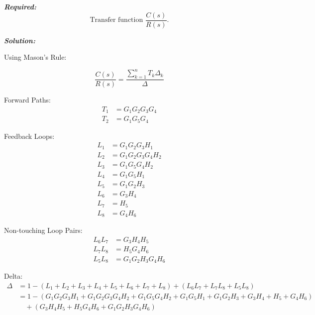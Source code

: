 ﻿\documentclass[11pt]{article}
\begin{document}
\noindent\textbf{\textit{Required:}}
\[
\text{Transfer function } \frac{C(s)}{R(s)}.
\]

\vspace{12pt}

\noindent \textbf{\textit{Solution:}}

\vspace{2pt}
{Using Mason's Rule:}

\[
\frac{C(s)}{R(s)} = \frac{\sum_{k=1}^{n} T_k \Delta_k}{\Delta}
\]

Forward Paths:
\begin{align*}
T_1 &= G_1 G_2 G_3 G_4 \\
T_2 &= G_1 G_5 G_4
\end{align*}

\vspace{0.5em}

Feedback Loops:
\begin{align*}
L_1 &= G_1 G_2 G_3 H_1 \\
L_2 &= G_1 G_2 G_3 G_4 H_2 \\
L_3 &= G_1 G_5 G_4 H_2 \\
L_4 &= G_1 G_5 H_1 \\
L_5 &= G_1 G_2 H_3 \\
L_6 &= G_3 H_4 \\
L_7 &= H_5 \\
L_8 &= G_4 H_6
\end{align*}

\vspace{0.5em}

Non-touching Loop Pairs:
\begin{align*}
L_6 L_7 &= G_3 H_4 H_5 \\
L_7 L_8 &= H_5 G_4 H_6 \\
L_5 L_8 &= G_1 G_2 H_3 G_4 H_6
\end{align*}

\vspace{0.5em}

Delta:
{\small
\begin{align*}
\Delta &= 1 - (L_1 + L_2 + L_3 + L_4 + L_5 + L_6 + L_7 + L_8) + (L_6 L_7 + L_7 L_8 + L_5 L_8) \\
       &= 1 - (G_1 G_2 G_3 H_1 + G_1 G_2 G_3 G_4 H_2 + G_1 G_5 G_4 H_2 + G_1 G_5 H_1 + G_1 G_2 H_3 + G_3 H_4 + H_5 + G_4 H_6) \\
       &\quad + (G_3 H_4 H_5 + H_5 G_4 H_6 + G_1 G_2 H_3 G_4 H_6)
\end{align*}
}

\vspace{0.5em}
\end{document}
